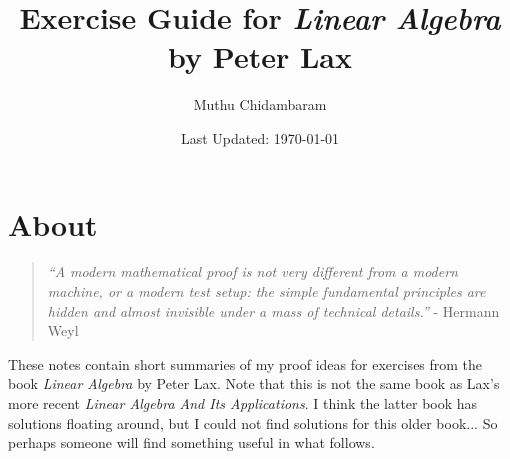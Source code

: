 \documentclass{article}
\begin{document}
\title{Exercise Guide for \textit{Linear Algebra} by Peter Lax}
\author{Muthu Chidambaram}
\date{Last Updated: \today}

\maketitle

\tableofcontents
\newpage 

\section*{About}

\begin{quote}
        \textit{``A modern mathematical proof is not very different from a modern machine,
or a modern test setup: the simple fundamental principles are hidden 
and almost invisible under a mass of technical details.''} - Hermann Weyl
\end{quote}

These notes contain short summaries of my proof ideas for exercises
from the book \textit{Linear Algebra} by Peter Lax.
Note that this is not the same book as Lax's more recent \textit{Linear Algebra And Its Applications}.
I think the latter book has solutions floating around, but I could not find solutions for this
older book... So perhaps someone will find something useful in what follows.








\end{document}
